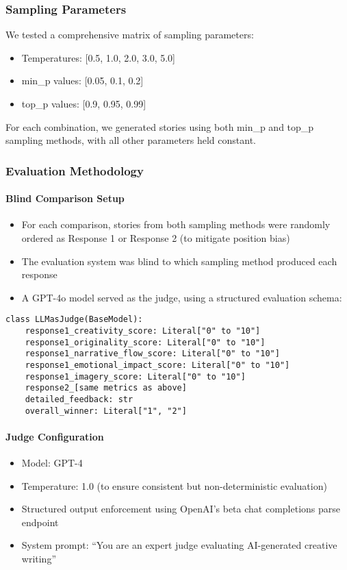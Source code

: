 \documentclass{article}
\begin{document}
\subsubsection{Sampling Parameters}

We tested a comprehensive matrix of sampling parameters:
\begin{itemize}
    \item Temperatures: [0.5, 1.0, 2.0, 3.0, 5.0]
    \item min\_p values: [0.05, 0.1, 0.2]
    \item top\_p values: [0.9, 0.95, 0.99]
\end{itemize}

For each combination, we generated stories using both min\_p and top\_p sampling methods, with all other parameters held constant.

\subsubsection{Evaluation Methodology}

\paragraph{Blind Comparison Setup}
\begin{itemize}
    \item For each comparison, stories from both sampling methods were randomly ordered as Response 1 or Response 2 (to mitigate position bias)
    \item The evaluation system was blind to which sampling method produced each response 
    \item A GPT-4o model served as the judge, using a structured evaluation schema:
\end{itemize}

\begin{verbatim}
class LLMasJudge(BaseModel):
    response1_creativity_score: Literal["0" to "10"]
    response1_originality_score: Literal["0" to "10"]
    response1_narrative_flow_score: Literal["0" to "10"]
    response1_emotional_impact_score: Literal["0" to "10"]
    response1_imagery_score: Literal["0" to "10"]
    response2_[same metrics as above]
    detailed_feedback: str
    overall_winner: Literal["1", "2"]
\end{verbatim}

\paragraph{Judge Configuration}
\begin{itemize}
    \item Model: GPT-4
    \item Temperature: 1.0 (to ensure consistent but non-deterministic evaluation)
    \item Structured output enforcement using OpenAI's beta chat completions parse endpoint
    \item System prompt: ``You are an expert judge evaluating AI-generated creative writing''
\end{itemize}
\end{document}
